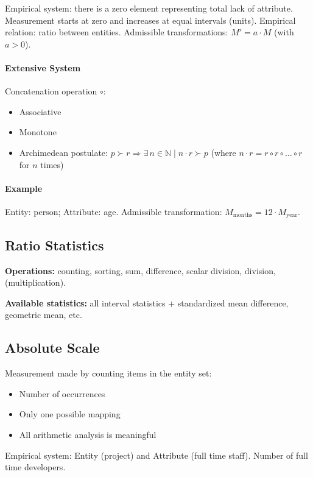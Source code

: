 Empirical system: there is a zero element representing total lack of attribute.
Measurement starts at zero and increases at equal intervals (units).
Empirical relation: ratio between entities.
Admissible transformations: $M' = a \cdot M$ (with $a > 0$).

\paragraph{Extensive System}
Concatenation operation $\circ$:
\begin{itemize}
  \item Associative
  \item Monotone
  \item Archimedean postulate: $p \succ r \Rightarrow \exists\, n \in \mathbb{N} \mid n \cdot r \succ p$
        (where $n \cdot r = r \circ r \circ \ldots \circ r$ for $n$ times)
\end{itemize}

\paragraph{Example}
Entity: person; Attribute: age.
Admissible transformation: $M_{\text{months}} = 12 \cdot M_{\text{year}}$.

\subsection{Ratio Statistics}
\textbf{Operations:} counting, sorting, sum, difference, scalar division, division, (multiplication).

\textbf{Available statistics:} all interval statistics + standardized mean difference, geometric mean, etc.

\subsection{Absolute Scale}

Measurement made by counting items in the entity set:
\begin{itemize}
  \item Number of occurrences
  \item Only one possible mapping
  \item All arithmetic analysis is meaningful
\end{itemize}

Empirical system: Entity (project) and Attribute (full time staff).
Number of full time developers.

